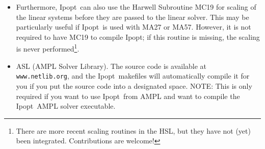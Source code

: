 \documentclass[10pt]{article}
\newcommand{\Ipopt}{{\sc Ipopt}}
\begin{document}
\begin{itemize}
  Currently, the following linear solvers can be used:
  \begin{itemize}
  \item MA27 from the Harwell Subroutine Library\\ (see {\tt
      http://www.cse.clrc.ac.uk/nag/hsl/}).
  \item MA57 from the Harwell Subroutine Library\\ (see {\tt
      http://www.cse.clrc.ac.uk/nag/hsl/}).
  \item MUMPS (MUltifrontal Massively Parallel sparse direct Solver)\\
    (see {\tt http://graal.ens-lyon.fr/MUMPS/})
  \item The Parallel Sparse Direct Solver (PARDISO)\\ (see {\tt
      http://www.computational.unibas.ch/cs/scicomp/software/pardiso/}).\\
    Note: The Pardiso version in Intel's MKL library does not yet
    support the features necessary for \Ipopt.
  \item The Watson Sparse Matrix Package (WSMP)\\ (see {\tt
       http://www-users.cs.umn.edu/\verb|~|agupta/wsmp.html})
  \end{itemize}
  You need to include at least one of the linear solvers above in
  order to run \Ipopt, and if you want to be able to switch easily
  between different alternatives, you can compile \Ipopt\ with all of
  them.

  \textbf{NOTE: The solution of the linear systems is a central
    ingredient in \Ipopt\ and the optimizer's performance and
    robustness depends on your choice.  Please keep this in mind,
    particularly when you are comparing \Ipopt\ with other
    optimization codes.}


  Interfaces to other linear solvers might be added in the future; if
  you are interested in contributing such an interface please contact
  us!  Note that \Ipopt\ requires that the linear solver is able to
  provide the inertia (number of positive and negative eigenvalues) of
  the symmetric matrix that is factorized.

\item Furthermore, \Ipopt\ can also use the Harwell Subroutine MC19
  for scaling of the linear systems before they are passed to the
  linear solver.  This may be particularly useful if \Ipopt\ is used
  with MA27 or MA57.  However, it is not required to have MC19 to
  compile \Ipopt; if this routine is missing, the scaling is never
  performed\footnote{There are more recent scaling routines in the
    HSL, but they have not (yet) been integrated.  Contributions are
    welcome!}.
\item ASL (AMPL Solver Library).  The source code is available at {\tt
    www.netlib.org}, and the \Ipopt\ makefiles will automatically
  compile it for you if you put the source code into a designated
  space.  NOTE: This is only required if you want to use \Ipopt\ from
  AMPL and want to compile the \Ipopt\ AMPL solver executable.
\end{itemize}
\end{document}

